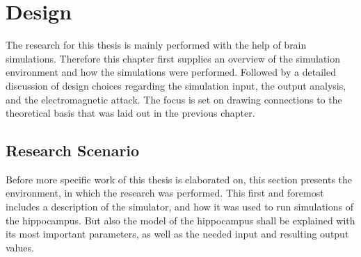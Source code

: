 \chapter{Design} %
\label{chap:design}
The research for this thesis is mainly performed with the help of brain simulations. Therefore this chapter first supplies an overview of the simulation environment and how the simulations were performed. Followed by a detailed discussion of design choices regarding the simulation input, the output analysis, and the electromagnetic attack. The focus is set on drawing connections to the theoretical basis that was laid out in the previous chapter.

\section{Research Scenario}
Before more specific work of this thesis is elaborated on, this section presents the environment, in which the research was performed. This first and foremost includes a description of the simulator, and how it was used to run simulations of the hippocampus. But also the model of the hippocampus shall be explained with its most important parameters, as well as the needed input and resulting output values.

